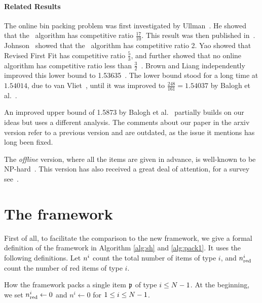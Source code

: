 \paragraph{Related Results}
The online bin packing problem was first investigated by
Ullman~\cite{Ullman71}.
He showed that the \ff\ algorithm has competitive ratio
$\frac{17}{10}$. This result was then published in~\cite{GaGrUl72}.
Johnson~\cite{Johnso74} showed that the \nf\ algorithm has competitive ratio 2.
Yao showed that {\sc Revised First Fit} has competitive ratio $\frac53$,
and further showed that no online algorithm has competitive ratio less
than $\frac32$~\cite{Yao80A}.
Brown and Liang independently improved this lower bound to
1.53635~\cite{Brown79,Liang80}.
The lower bound stood for a long time at $1.54014$,
due to van Vliet~\cite{Vliet92},
until it was improved to $\frac{248}{161}= 1.54037$ by Balogh et al.~\cite{BBG12}.

An improved upper bound of 1.5873 by Balogh et al.~\cite{arxiv} partially builds on our ideas but uses a different analysis. The comments about our paper in the arxiv version refer to a previous version and are outdated, as the issue it mentions has long been fixed.

The \emph{offline} version, where all the items are given in advance, 
is well-known to be NP-hard~\cite{GarJoh79}. 
This version has also received a great deal of attention,
for a survey see~\cite{CoGaJo97}.





\section{The {\EHarm} framework}
First of all, to facilitate the comparison to the new framework, we give a formal definition of
the {\SuperH} framework in Algorithm \ref{alg:sh} and \ref{alg:pack1}. It uses the following definitions.
Let $n^i$ count the total number of items of type $i$, and $n_{\mathrm{red}}^i$ count the number of red items of type $i$.

\begin{algorithm}
	\caption{\label{alg:sh}How the \SuperH{} framework packs a single item $\mathfrak{p}$ of type $i\le N-1$.
		At the beginning, we set $n_{\mathrm{red}}^i \gets 0$ and $n^i \gets 0$ for $1\le i \le N-1$.}
	\label{SuperH}
	\begin{algorithmic}[1]
		\Else{}
		\EndIf
	\end{algorithmic}
\end{algorithm}

